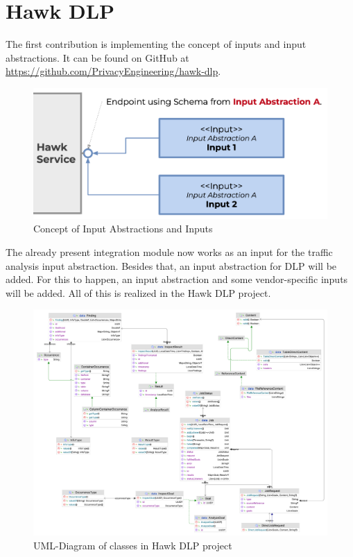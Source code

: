 \section{Hawk DLP}

The first contribution is implementing the concept of inputs and input abstractions.
It can be found on GitHub at \url{https://github.com/PrivacyEngineering/hawk-dlp}.

\begin{figure}[!h]
  \centering
  \includegraphics[width=0.95\columnwidth]{input.png}
  \caption[Input Abstractions \& Inputs]{Concept of Input Abstractions and Inputs}
  \label{fig:input}
\end{figure}

The already present integration module now works as an input for the traffic analysis input abstraction. 
Besides that, an input abstraction for DLP will be added. For this to happen, an input abstraction and some vendor-specific inputs will be added. All of this is realized in the Hawk DLP project.

\begin{figure}[!htb]
  \centering

  \includegraphics[width=0.95\columnwidth]{hawk-dlp-uml.png}

  \caption[Hawk DLP UML]{UML-Diagram of classes in Hawk DLP project}  
  \label{fig:hawk-dlp-uml}
\end{figure}

